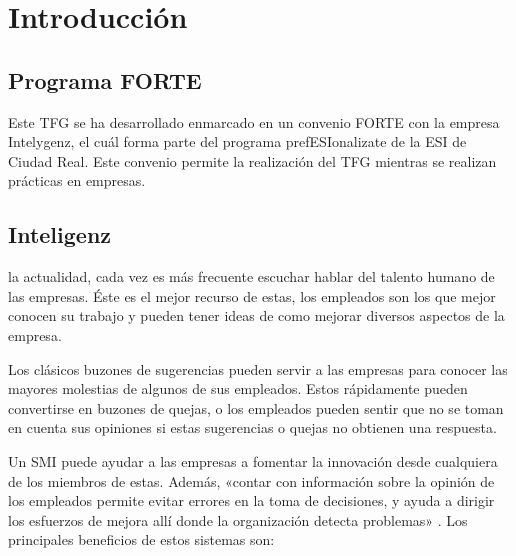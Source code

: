 \chapter{Introducción}

\section{Programa FORTE}

Este \acf{TFG} se ha desarrollado enmarcado en un convenio \acf{FORTE} con la empresa Intelygenz, el cuál forma parte del programa prefESIonalizate de la \acf{ESI} de Ciudad Real. Este
convenio permite la realización del TFG mientras se realizan prácticas en empresas.

\section{Inteligenz}



 la actualidad, cada vez es más frecuente escuchar hablar del talento humano de las empresas. Éste es el mejor recurso de estas,
 los empleados son los que mejor conocen su trabajo y pueden tener ideas de como mejorar diversos aspectos de la empresa. 
 
 Los clásicos buzones de sugerencias pueden servir a las empresas para conocer las mayores molestias de
  algunos de sus empleados. Estos rápidamente pueden convertirse en buzones de quejas, o los empleados pueden
   sentir que no se toman en cuenta sus opiniones si estas  sugerencias o quejas no obtienen una respuesta.
 
 Un \acf{SMI} puede ayudar a las empresas a fomentar la innovación desde cualquiera de los miembros de 
 estas. Además, «contar con información sobre la opinión de los empleados permite evitar errores en la toma
  de decisiones, y ayuda a dirigir los esfuerzos de mejora allí donde la organización detecta problemas»
   \cite{talento}. Los principales beneficios de estos sistemas son:
 
